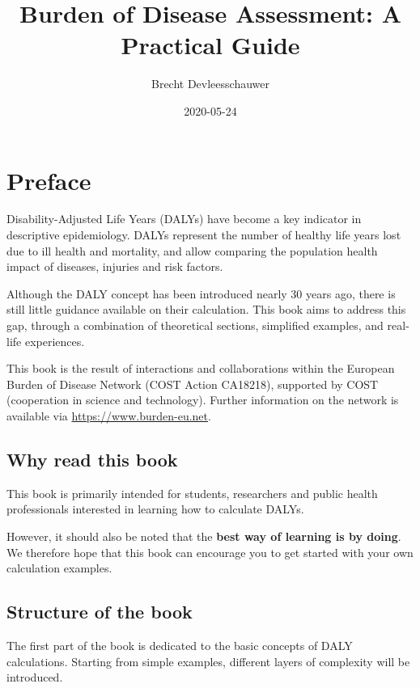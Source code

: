 \documentclass[
]{book}
\title{Burden of Disease Assessment: A Practical Guide}
\author{Brecht Devleesschauwer}
\date{2020-05-24}
\begin{document}
\maketitle

{
\setcounter{tocdepth}{1}
\tableofcontents
}
\hypertarget{preface}{%
\chapter*{Preface}\label{preface}}

Disability-Adjusted Life Years (DALYs) have become a key indicator in descriptive epidemiology. DALYs represent the number of healthy life years lost due to ill health and mortality, and allow comparing the population health impact of diseases, injuries and risk factors.

Although the DALY concept has been introduced nearly 30 years ago, there is still little guidance available on their calculation. This book aims to address this gap, through a combination of theoretical sections, simplified examples, and real-life experiences.

This book is the result of interactions and collaborations within the European Burden of Disease Network (COST Action CA18218), supported by COST (cooperation in science and technology). Further information on the network is available via \url{https://www.burden-eu.net}.

\hypertarget{why-read-this-book}{%
\section*{Why read this book}\label{why-read-this-book}}

This book is primarily intended for students, researchers and public health professionals interested in learning how to calculate DALYs.

However, it should also be noted that the \textbf{best way of learning is by doing}. We therefore hope that this book can encourage you to get started with your own calculation examples.

\hypertarget{structure-of-the-book}{%
\section*{Structure of the book}\label{structure-of-the-book}}

The first part of the book is dedicated to the basic concepts of DALY calculations. Starting from simple examples, different layers of complexity will be introduced.
\end{document}
